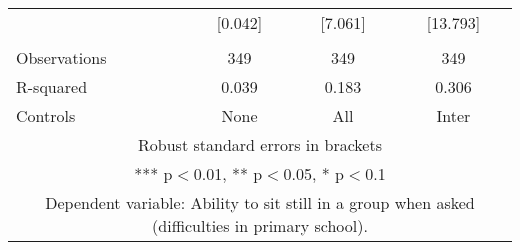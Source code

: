 \begin{tabular}{lccc}
 & [0.042] & [7.061] & [13.793] \\
 &  &  &  \\
Observations & 349 & 349 & 349 \\
R-squared & 0.039 & 0.183 & 0.306 \\
 Controls & None & All & Inter \\ \hline
\multicolumn{4}{c}{ Robust standard errors in brackets} \\
\multicolumn{4}{c}{ *** p$<$0.01, ** p$<$0.05, * p$<$0.1} \\
\multicolumn{4}{c}{ Dependent variable: Ability to sit still in a group when asked (difficulties in primary school).} \\
\end{tabular}
